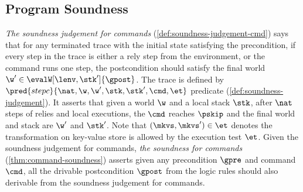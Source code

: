 \subsection{Program Soundness}

\emph{The soundness judgement for commands} (\cref{def:soundness-judgement-cmd}) says that for any terminated trace with the initial state satisfying the precondition, if every step in the trace is either a rely step from the environment,
or the command runs one step, the postcondition should satisfy the final world \( \w' \in \evalW[\lenv,\stk']{\gpost} \).
The trace is defined by \( \pred{stepc}{\nat, \w, \w', \stk, \stk', \cmd, \et} \) predicate (\cref{def:soundness-judgement}).
It asserts that given a world \( \w \) and a local stack \( \stk \), after \( \nat \) steps of relies and local executions, the \( \cmd \) reaches \( \pskip \) and the final world and stack are \( \w'\) and \( \stk' \).
Note that \( (\mkvs, \mkvs') \in \et \) denotes the transformation on key-value store is allowed by the execution test \( \et \).
Given the soundness judgement for commands, \emph{the soundness for commands} (\cref{thm:command-soundness}) asserts given any precondition \( \gpre \) and command \( \cmd \), all the drivable postcondition \( \gpost \) from the logic rules should also derivable from the soundness judgement for commands.

